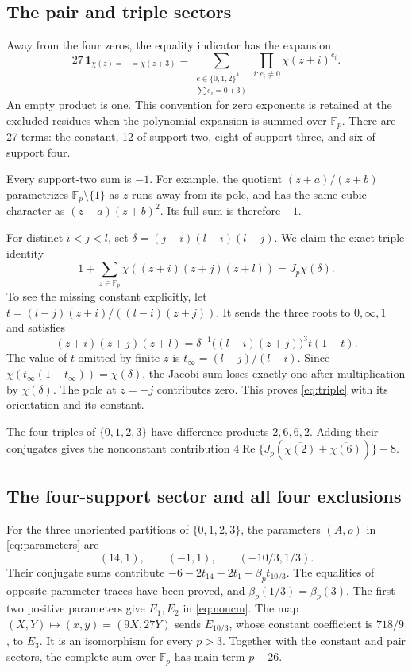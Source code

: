\documentclass[11pt]{article}
\theoremstyle{definition}\newtheorem{definition}[theorem]{Definition}
\newcommand{\Fp}{\mathbb F_p}
\newcommand{\Rea}{\operatorname{Re}}
\newcommand{\ind}{\mathbf1}
\begin{document}
\subsection{The pair and triple sectors}
Away from the four zeros, the equality indicator has the expansion
\begin{equation}\label{eq:expansion}
 27\,\ind_{\chi(z)=\cdots=\chi(z+3)}
 =\sum_{\substack{e\in\{0,1,2\}^4\\\sum e_i=0\ (3)}}
   \prod_{i:e_i\ne0}\chi(z+i)^{e_i}.
\end{equation}
An empty product is one. This convention for zero exponents
is retained at the excluded residues when the polynomial
expansion is summed over $\Fp$.
There are 27 terms: the constant, 12 of support two, eight
of support three, and six of support four.

Every support-two sum is $-1$. For example, the quotient
$(z+a)/(z+b)$ parametrizes $\Fp\setminus\{1\}$ as $z$ runs
away from its pole, and has the same cubic character as
$(z+a)(z+b)^2$. Its full sum is therefore $-1$.

For distinct $i<j<l$, set
$\delta=(j-i)(l-i)(l-j)$.
We claim the exact triple identity
\begin{equation}\label{eq:triple}
 1+\sum_{z\in\Fp}\chi((z+i)(z+j)(z+l))
 =J_p\overline{\chi(\delta)}.
\end{equation}
To see the missing constant explicitly, let
$t=(l-j)(z+i)/((l-i)(z+j))$.
It sends the three roots to $0,\infty,1$ and satisfies
\[
 (z+i)(z+j)(z+l)=
 \delta^{-1}\big((l-i)(z+j)\big)^3t(1-t).
\]
The value of $t$ omitted by finite $z$ is
$t_\infty=(l-j)/(l-i)$.
Since $\chi(t_\infty(1-t_\infty))=\chi(\delta)$,
the Jacobi sum loses exactly one after multiplication by
$\overline{\chi(\delta)}$. The pole at $z=-j$ contributes zero.
This proves \eqref{eq:triple} with its orientation and its constant.

The four triples of $\{0,1,2,3\}$ have difference products
$2,6,6,2$. Adding their conjugates gives the nonconstant
contribution
$4\Rea\{J_p(\overline{\chi(2)}+\overline{\chi(6)})\}-8$.

\subsection{The four-support sector and all four exclusions}
For the three unoriented partitions of $\{0,1,2,3\}$, the
parameters $(A,\rho)$ in \eqref{eq:parameters} are
\[
 (14,1),\qquad(-1,1),\qquad(-10/3,1/3).
\]
Their conjugate sums contribute
$-6-2t_{14}-2t_1-\beta_p t_{10/3}$.
The equalities of opposite-parameter traces have been proved,
and $\beta_p(1/3)=\beta_p(3)$.
The first two positive parameters give $E_1,E_2$ in
\eqref{eq:noncm}. The map
$(X,Y)\mapsto(x,y)=(9X,27Y)$ sends $E_{10/3}$,
whose constant coefficient is $718/9$, to $E_3$.
It is an isomorphism for every $p>3$.
Together with the constant and pair sectors, the complete
sum over $\Fp$ has main term $p-26$.
\end{document}
